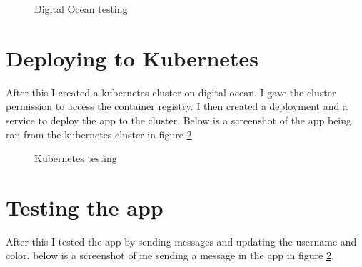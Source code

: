 \documentclass[12pt]{Article}
\begin{document}
\begin{figure}[H]
    \centering
    \caption{Digital Ocean testing}
    \label{fig:app}
\end{figure}

\section{Deploying to Kubernetes}
After this I created a kubernetes cluster on digital ocean.
I gave the cluster permission to access the container registry.
I then created a deployment and a service to deploy the app to the cluster.
Below is a screenshot of the app being ran from the kubernetes cluster in figure \ref{fig:app}.

\begin{figure}[H]
    \centering
    \caption{Kubernetes testing}
    \label{fig:app}
\end{figure}

\section{Testing the app}
After this I tested the app by sending messages and updating the username and color.
below is a screenshot of me sending a message in the app in figure \ref{fig:app}.
\end{document}
